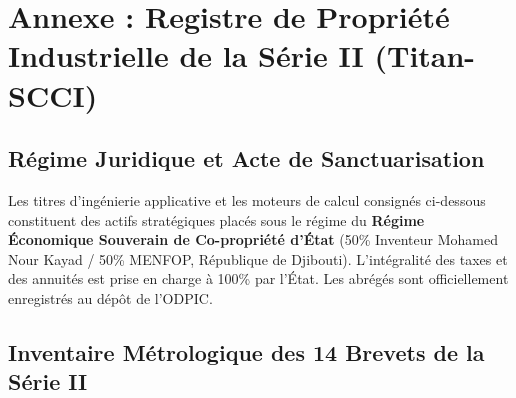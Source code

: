 \chapter*{Annexe : Registre de Propriété Industrielle de la Série II (Titan-SCCI)}
\label{ch:annexe_industrial_patents}

\section*{Régime Juridique et Acte de Sanctuarisation}
Les titres d'ingénierie applicative et les moteurs de calcul consignés ci-dessous constituent des actifs stratégiques placés sous le régime du \textbf{Régime Économique Souverain de Co-propriété d'État} (50\% Inventeur Mohamed Nour Kayad / 50\% MENFOP, République de Djibouti). L'intégralité des taxes et des annuités est prise en charge à 100\% par l'État. Les abrégés sont officiellement enregistrés au dépôt de l'ODPIC.

\section*{Inventaire Métrologique des 14 Brevets de la Série II}

